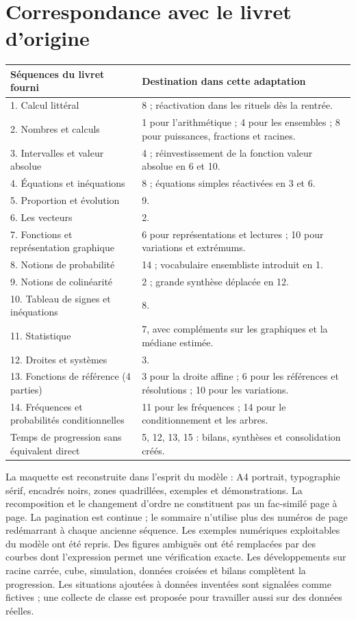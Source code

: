\clearpage\section*{Correspondance avec le livret d'origine}
\begin{center}\small\renewcommand{\arraystretch}{1.5}\begin{tabularx}{\linewidth}{p{6.3cm} X}
\textbf{Séquences du livret fourni}&\textbf{Destination dans cette adaptation}\\\hline
1. Calcul littéral&8 ; réactivation dans les rituels dès la rentrée.\\
2. Nombres et calculs&1 pour l'arithmétique ; 4 pour les ensembles ; 8 pour puissances, fractions et racines.\\
3. Intervalles et valeur absolue&4 ; réinvestissement de la fonction valeur absolue en 6 et 10.\\
4. Équations et inéquations&8 ; équations simples réactivées en 3 et 6.\\
5. Proportion et évolution&9.\\
6. Les vecteurs&2.\\
7. Fonctions et représentation graphique&6 pour représentations et lectures ; 10 pour variations et extrémums.\\
8. Notions de probabilité&14 ; vocabulaire ensembliste introduit en 1.\\
9. Notions de colinéarité&2 ; grande synthèse déplacée en 12.\\
10. Tableau de signes et inéquations&8.\\
11. Statistique&7, avec compléments sur les graphiques et la médiane estimée.\\
12. Droites et systèmes&3.\\
13. Fonctions de référence (4 parties)&3 pour la droite affine ; 6 pour les références et résolutions ; 10 pour les variations.\\
14. Fréquences et probabilités conditionnelles&11 pour les fréquences ; 14 pour le conditionnement et les arbres.\\\hline
Temps de progression sans équivalent direct&5, 12, 13, 15 : bilans, synthèses et consolidation créés.
\end{tabularx}\end{center}
La maquette est reconstruite dans l'esprit du modèle : A4 portrait, typographie sérif, encadrés noirs, zones quadrillées, exemples et démonstrations. La recomposition et le changement d'ordre ne constituent pas un fac-similé page à page. La pagination est continue ; le sommaire n'utilise plus des numéros de page redémarrant à chaque ancienne séquence.
Les exemples numériques exploitables du modèle ont été repris. Des figures ambiguës ont été remplacées par des courbes dont l'expression permet une vérification exacte. Les développements sur racine carrée, cube, simulation, données croisées et bilans complètent la progression. Les situations ajoutées à données inventées sont signalées comme fictives ; une collecte de classe est proposée pour travailler aussi sur des données réelles.

